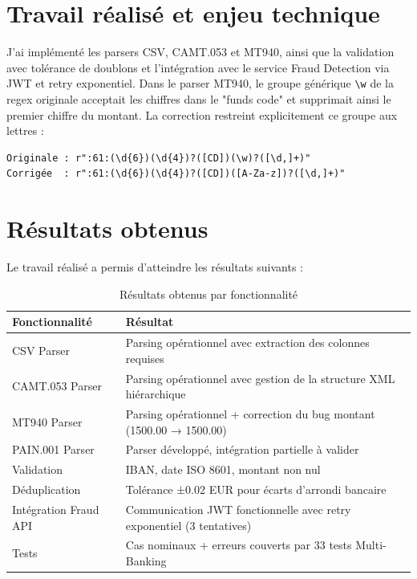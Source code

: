 \documentclass[12pt,a4paper]{extreport}
\begin{document}
\section{Travail réalisé et enjeu technique}

J'ai implémenté les parsers CSV, CAMT.053 et MT940, ainsi que la validation avec tolérance de doublons et l'intégration avec le service Fraud Detection via JWT et retry exponentiel. Dans le parser MT940, le groupe générique \verb|\w| de la regex originale acceptait les chiffres dans le "funds code" et supprimait ainsi le premier chiffre du montant. La correction restreint explicitement ce groupe aux lettres :

\begin{verbatim}
Originale : r":61:(\d{6})(\d{4})?([CD])(\w)?([\d,]+)"
Corrigée  : r":61:(\d{6})(\d{4})?([CD])([A-Za-z])?([\d,]+)"
\end{verbatim}

\section{Résultats obtenus}

Le travail réalisé a permis d'atteindre les résultats suivants :

\begin{table}[!htbp]
\centering
\caption{Résultats obtenus par fonctionnalité}
\label{tab:results-obtained}
\small
\begin{tabularx}{0.95\textwidth}{|
    >{\raggedright\arraybackslash}p{3cm}|
    >{\raggedright\arraybackslash}X|}
\hline
\textbf{Fonctionnalité} & \textbf{Résultat} \\
\hline
CSV Parser & Parsing opérationnel avec extraction des colonnes requises \\
CAMT.053 Parser & Parsing opérationnel avec gestion de la structure XML hiérarchique \\
MT940 Parser & Parsing opérationnel + correction du bug montant (1500.00 → 1500.00) \\
PAIN.001 Parser & Parser développé, intégration partielle à valider \\
Validation & IBAN, date ISO 8601, montant non nul \\
Déduplication & Tolérance ±0.02 EUR pour écarts d'arrondi bancaire \\
Intégration Fraud API & Communication JWT fonctionnelle avec retry exponentiel (3 tentatives) \\
Tests & Cas nominaux + erreurs couverts par 33 tests Multi-Banking \\
\hline
\end{tabularx}
\end{table}
\end{document}
